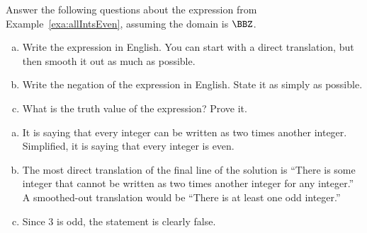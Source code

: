 \begin{exer}
Answer the following questions about the expression from Example~\ref{exa:allIntsEven},
assuming the domain is $\BBZ$.
\begin{enumerate}[(a)]
\item
Write the expression in English.  You can start with a direct translation, but then smooth it out as much as possible.\\
\answerlinetwo
\item
Write the negation of the expression in English. State it as simply as possible.\\
\answerlinetwo
\item
What is the truth value of the expression?  Prove it.\\
\answerlinetwo
\end{enumerate}
\begin{answer}
\begin{enumerate}[(a)]
\item
It is saying that every integer can be written as two times another integer.
Simplified, it is saying that every integer is even.
\item
The most direct translation of the final line of the solution is ``There is some integer that cannot be
written as two times another integer for any integer.''  A smoothed-out translation would be ``There is at
least one odd integer.''
\item
Since $3$ is odd, the statement is clearly false.
\end{enumerate}
\end{answer}
\end{exer}

